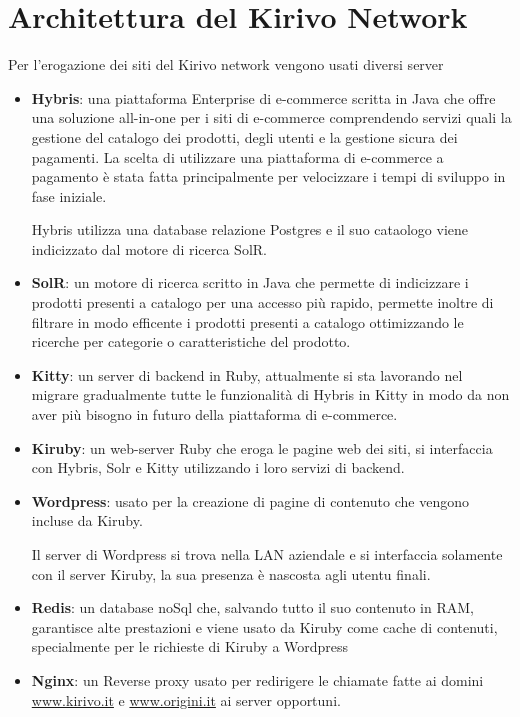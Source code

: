 \section{Architettura del Kirivo Network}
Per l'erogazione dei siti del Kirivo network vengono usati diversi server
\begin{itemize}
\item {\bf Hybris}: una piattaforma Enterprise di e-commerce scritta in Java che offre una soluzione all-in-one per i siti 
di e-commerce comprendendo servizi quali la gestione del catalogo dei prodotti, degli utenti e la 
gestione sicura dei pagamenti. La scelta di utilizzare una piattaforma di e-commerce a pagamento è stata fatta
principalmente per velocizzare i tempi di sviluppo in fase iniziale.

Hybris utilizza una database relazione Postgres e il suo cataologo viene indicizzato dal motore di ricerca SolR.

\item {\bf SolR}: un motore di ricerca scritto in Java che permette di indicizzare i prodotti presenti a catalogo per una accesso
più rapido, permette inoltre di filtrare in modo efficente i prodotti presenti a catalogo ottimizzando
le ricerche per categorie o caratteristiche del prodotto.
\item {\bf Kitty}: un server di backend in Ruby, attualmente si sta lavorando nel migrare gradualmente tutte le funzionalità
di Hybris in Kitty in modo da non aver più bisogno in futuro della piattaforma di e-commerce.
\item {\bf Kiruby}: un web-server Ruby che eroga le pagine web dei siti, si interfaccia con Hybris, Solr e Kitty utilizzando i loro
servizi di backend. 
\item {\bf Wordpress}: usato per la creazione di pagine di contenuto che vengono incluse da Kiruby.

Il server di Wordpress si trova nella LAN aziendale e si interfaccia solamente con il server Kiruby, la sua
presenza è nascosta agli utentu finali.
\item {\bf Redis}: un database noSql che, salvando tutto il suo contenuto in RAM, garantisce alte prestazioni
e viene usato da Kiruby come cache di contenuti, specialmente per le richieste di Kiruby a Wordpress 
\item {\bf Nginx}: un Reverse proxy usato per redirigere le chiamate fatte ai domini \url{www.kirivo.it} 
e \url{www.origini.it} ai server opportuni.
\end{itemize}

